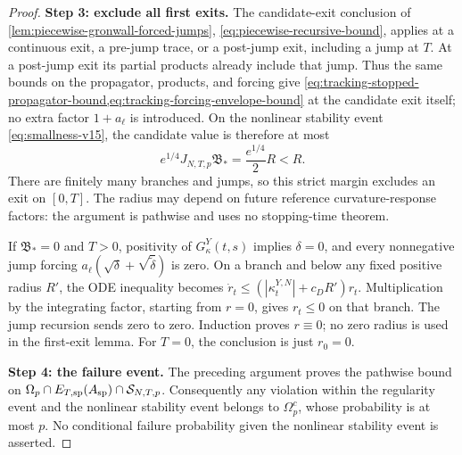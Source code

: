\begin{proof}
\par\noindent\textbf{Step 3: exclude all first exits.}
The candidate-exit conclusion of
\cref{lem:piecewise-gronwall-forced-jumps},
\eqref{eq:piecewise-recursive-bound}, applies at a continuous exit,
a pre-jump trace, or a post-jump exit, including a jump at $T$.
At a post-jump exit its partial products already include that jump.
Thus the same bounds on the propagator, products, and forcing give
\cref{eq:tracking-stopped-propagator-bound,eq:tracking-forcing-envelope-bound}
at the candidate exit itself; no extra factor $1+a_\ell$ is introduced.
On the nonlinear stability event \eqref{eq:smallness-v15}, the candidate value is
therefore at most
\[
 e^{1/4}J_{N,T,p}\mathfrak B_*
 =\frac{e^{1/4}}2 R<R.
\]
There are finitely many branches and jumps, so this strict margin excludes
an exit on $[0,T]$. The radius may depend on future reference curvature-response factors:
the argument is pathwise and uses no stopping-time theorem.

If $\mathfrak B_*=0$ and $T>0$, positivity of $G_\kappa^Y(t,s)$ implies
$\delta=0$, and every nonnegative jump forcing
$a_\ell(\sqrt\delta+\sqrt{\widetilde\delta})$ is zero. On a branch and
below any fixed positive radius $R'$, the ODE inequality becomes
$\dot r_t\le(|\kappa_t^{Y,N}|+c_DR')r_t$.
Multiplication by the integrating factor, starting from $r=0$, gives
$r_t\le0$ on that branch. The jump recursion sends zero to zero.
Induction proves $r\equiv0$; no zero radius is used in the first-exit lemma.
For $T=0$, the conclusion is just $r_0=0$.

\par\noindent\textbf{Step 4: the failure event.}
The preceding argument proves the pathwise bound on
$\Omega_p\cap E_{T,\rm sp}(A_{\rm sp})\cap\mathcal S_{N,T,p}$.
Consequently any violation within the regularity event and the nonlinear stability event
belongs to $\Omega_p^c$, whose probability is at most $p$. No conditional
failure probability given the nonlinear stability event is asserted.
\end{proof}

